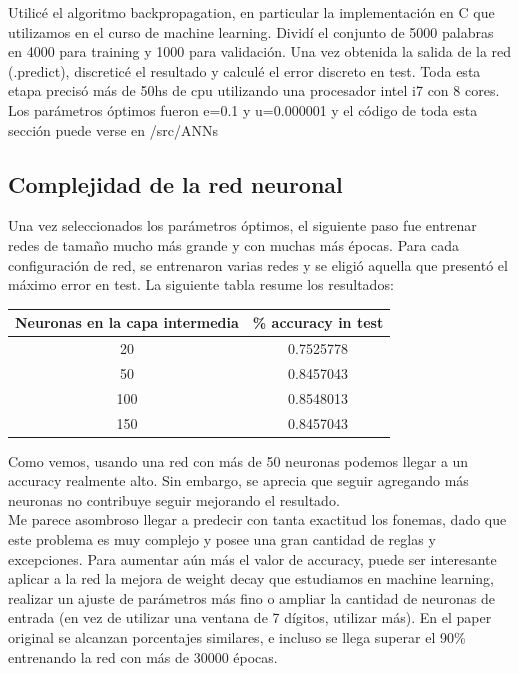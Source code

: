 \documentclass[paper=a4, fontsize=11pt]{scrartcl} %
\numberwithin{equation}{section} %
\numberwithin{figure}{section} %
\numberwithin{table}{section} %
\begin{document}
Utilicé el algoritmo backpropagation, en particular la implementación en C que utilizamos en el curso de machine learning. Dividí el conjunto de 5000 palabras en 4000 para training y 1000 para validación. Una vez obtenida la salida de la red (.predict), discreticé el resultado y calculé el error discreto en test. Toda esta etapa precisó más de 50hs de cpu utilizando una procesador intel i7 con 8 cores. Los parámetros óptimos fueron e=0.1 y u=0.000001 y el código de toda esta sección puede verse en /src/ANNs

\subsection{Complejidad de la red neuronal}
Una vez seleccionados los parámetros óptimos, el siguiente paso fue entrenar redes de tamaño mucho más grande  y con muchas más épocas. Para cada configuración de red, se entrenaron varias redes y se eligió aquella que presentó el máximo error en test.  La siguiente tabla resume los resultados:

\begin{center}
\begin{tabular}{ |c| c|  }
\hline
Neuronas en la capa intermedia & \% accuracy in test \\
\hline 
20  & 0.7525778  \\
50  & 0.8457043  \\
100 & 0.8548013  \\
150 & 0.8457043  \\
\hline
\end{tabular}
\end{center}


Como vemos, usando una red con más de 50 neuronas podemos llegar a un accuracy realmente alto. Sin embargo, se aprecia que seguir agregando más neuronas no contribuye seguir mejorando el resultado. \\

Me parece asombroso llegar a predecir con tanta exactitud los fonemas, dado que este problema es muy complejo y posee una gran cantidad de reglas y excepciones. Para aumentar aún más el valor de accuracy, puede ser interesante aplicar a la red la mejora de weight decay que estudiamos en machine learning, realizar un ajuste de parámetros más fino o ampliar la cantidad de neuronas de entrada (en vez de utilizar una ventana de 7 dígitos, utilizar más). En el paper original se alcanzan porcentajes similares, e incluso se llega superar el 90\% entrenando la red con más de 30000 épocas.\\
\end{document}
